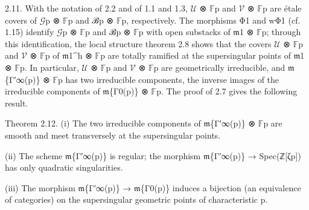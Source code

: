 \documentclass[11pt,a4paper]{article}
\begin{document}
2.11. With the notation of 2.2 and of 1.1 and 1.3, \ensuremath{\mathcal{U}} ⊗ \ensuremath{\mathbb{F}}\textunderscore{}p and \ensuremath{\mathcal{V}} ⊗ \ensuremath{\mathbb{F}}\textunderscore{}p are étale covers of \ensuremath{\mathcal{G}}\textunderscore{}p ⊗ \ensuremath{\mathbb{F}}\textunderscore{}p and ℬ\textunderscore{}p ⊗ \ensuremath{\mathbb{F}}\textunderscore{}p, respectively. The morphisms Φ\textunderscore{}1 and wΦ\textunderscore{}1 (cf. 1.15) identify \ensuremath{\mathcal{G}}\textunderscore{}p ⊗ \ensuremath{\mathbb{F}}\textunderscore{}p and ℬ\textunderscore{}p ⊗ \ensuremath{\mathbb{F}}\textunderscore{}p with open substacks of \ensuremath{\mathfrak{m}}\textunderscore{}1 ⊗ \ensuremath{\mathbb{F}}\textunderscore{}p; through this identification, the local structure theorem 2.8 shows that the covers \ensuremath{\mathcal{U}} ⊗ \ensuremath{\mathbb{F}}\textunderscore{}p and \ensuremath{\mathcal{V}} ⊗ \ensuremath{\mathbb{F}}\textunderscore{}p of \ensuremath{\mathfrak{m}}\textunderscore{}1\textasciicircum{}h ⊗ \ensuremath{\mathbb{F}}\textunderscore{}p are totally ramified at the supersingular points of \ensuremath{\mathfrak{m}}\textunderscore{}1 ⊗ \ensuremath{\mathbb{F}}\textunderscore{}p. In particular, \ensuremath{\mathcal{U}} ⊗ \ensuremath{\mathbb{F}}\textunderscore{}p and \ensuremath{\mathcal{V}} ⊗ \ensuremath{\mathbb{F}}\textunderscore{}p are geometrically irreducible, and \ensuremath{\mathfrak{m}}\textunderscore{}\{Γ′\textunderscore{}∞(p)\} ⊗ \ensuremath{\mathbb{F}}\textunderscore{}p has two irreducible components, the inverse images of the irreducible components of \ensuremath{\mathfrak{m}}\textunderscore{}\{Γ\textunderscore{}0(p)\} ⊗ \ensuremath{\mathbb{F}}\textunderscore{}p. The proof of 2.7 gives the following result.

Theorem 2.12. (i) The two irreducible components of \ensuremath{\mathfrak{m}}\textunderscore{}\{Γ′\textunderscore{}∞(p)\} ⊗ \ensuremath{\mathbb{F}}\textunderscore{}p are smooth and meet transversely at the supersingular points.

(ii) The scheme \ensuremath{\mathfrak{m}}\textunderscore{}\{Γ′\textunderscore{}∞(p)\} is regular; the morphism \ensuremath{\mathfrak{m}}\textunderscore{}\{Γ′\textunderscore{}∞(p)\} → Spec(ℤ[ζ\textunderscore{}p]) has only quadratic singularities.

(iii) The morphism \ensuremath{\mathfrak{m}}\textunderscore{}\{Γ′\textunderscore{}∞(p)\} → \ensuremath{\mathfrak{m}}\textunderscore{}\{Γ\textunderscore{}0(p)\} induces a bijection (an equivalence of categories) on the supersingular geometric points of characteristic p.
\end{document}

